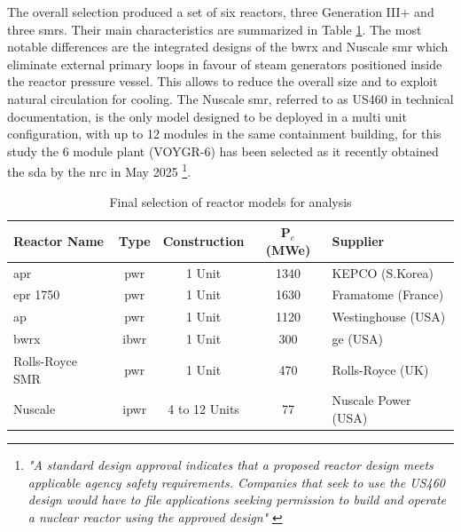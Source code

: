 The overall selection produced a set of six reactors, three Generation III+ and three \glspl{smr}. Their main characteristics are summarized in Table \ref{tab:final-reactor-selection}. The most notable differences are the integrated designs of the \gls{bwrx} and Nuscale \gls{smr} which eliminate external primary loops in favour of steam generators positioned inside the reactor pressure vessel. This allows to reduce the overall size and to exploit natural circulation for cooling. The Nuscale \gls{smr}, referred to as US460 in technical documentation, is the only model designed to be deployed in a multi unit configuration, with up to 12 modules in the same containment building, for this study the 6 module plant (VOYGR-6) has been selected as it recently obtained the \gls{sda} by the \gls{nrc} in May 2025 \footnote{\textit{"A standard design approval indicates that a proposed reactor design meets applicable agency safety requirements. Companies that seek to use the US460 design would have to file applications seeking permission to build and operate a nuclear reactor using the approved design"} \cite{NRC_2025_033}}.

\begin{table}[!htbp]
\centering
\begin{tabularx}{\textwidth}{lcccl}
\toprule
\textbf{Reactor Name} & \textbf{Type} & \textbf{Construction} & \textbf{P$_e$ (MWe)} & \textbf{Supplier} \\
\midrule
\gls{apr} & \gls{pwr}  & 1 Unit & 1340 & KEPCO (S.Korea) \\
\gls{epr} 1750 & \gls{pwr}  & 1 Unit & 1630 & Framatome (France) \\
\gls{ap} & \gls{pwr}  & 1 Unit & 1120 & Westinghouse (USA) \\
\gls{bwrx} & \gls{ibwr} & 1 Unit & 300 & \gls{ge} (USA)\\
Rolls-Royce SMR & \gls{pwr}  & 1 Unit  & 470 & Rolls-Royce (UK) \\
Nuscale & \gls{ipwr} & 4 to 12 Units & 77 & Nuscale Power (USA) \\
\bottomrule
\end{tabularx}
\caption{Final selection of reactor models for analysis}
\label{tab:final-reactor-selection}
\end{table}